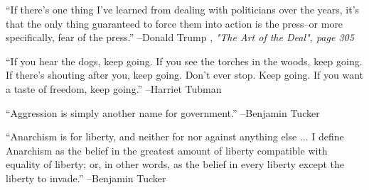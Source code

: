 \documentclass{article}%
\begin{document}
\linebreak%
\vspace{1mm}%
\begin{minipage}{\textwidth}%
\flushleft%
“If there's one thing I've learned from dealing with politicians over the years, it's that the only thing guaranteed to force them into action is the press–or more specifically, fear of the press.”%
\linebreak%
\vspace{1mm}%
–Donald Trump%
, \textit{"The Art of the Deal", page 305}%
\linebreak%
\vspace{1mm}%
\end{minipage}%
\linebreak%
\vspace{1mm}%
\begin{minipage}{\textwidth}%
\flushleft%
“If you hear the dogs, keep going. If you see the torches in the woods, keep going. If there's shouting after you, keep going. Don't ever stop. Keep going. If you want a taste of freedom, keep going.”%
\linebreak%
\vspace{1mm}%
–Harriet Tubman%
\linebreak%
\vspace{1mm}%
\end{minipage}%
\linebreak%
\vspace{1mm}%
\begin{minipage}{\textwidth}%
\flushleft%
“Aggression is simply another name for government.”%
\linebreak%
\vspace{1mm}%
–Benjamin Tucker%
\linebreak%
\vspace{1mm}%
\end{minipage}%
\linebreak%
\vspace{1mm}%
\begin{minipage}{\textwidth}%
\flushleft%
“Anarchism is for liberty, and neither for nor against anything else ... I define Anarchism as the belief in the greatest amount of liberty compatible with equality of liberty; or, in other words, as the belief in every liberty except the liberty to invade.”%
\linebreak%
\vspace{1mm}%
–Benjamin Tucker%
\linebreak%
\vspace{1mm}%
\end{minipage}%
\end{document}
